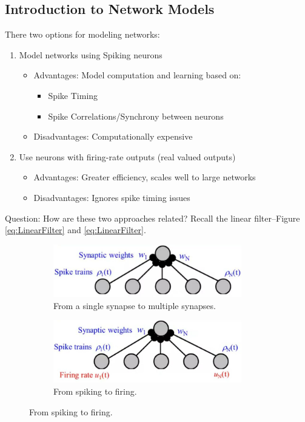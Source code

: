 \documentclass[]{article}
\begin{document}
\subsection{Introduction to Network Models}

There  two options for modeling networks: 
\begin{enumerate}
	\item  Model networks using Spiking neurons
	\begin{itemize}
		\item Advantages: Model computation and learning based on:
		\begin{itemize}
			\item Spike Timing
			\item Spike Correlations/Synchrony between neurons
		\end{itemize}
		\item Disadvantages: Computationally expensive
	\end{itemize}
	\item Use neurons with firing-rate outputs (real valued outputs)
	\begin{itemize}
		\item Advantages: Greater efficiency, scales well to large networks
		\item Disadvantages: Ignores spike timing issues
	\end{itemize}
\end{enumerate}

Question: How are these two approaches related?
Recall the linear filter--Figure \ref{eq:LinearFilter} and \eqref{eq:LinearFilter}.

\begin{figure}[H]
	\begin{center}
		\caption{Constructing a Model}
		\begin{subfigure}[t]{0.45\textwidth}
			\caption{From a single synapse to multiple synapses.}\label{fig:from-single-synapse-to-multiple}
			\includegraphics[width=0.9\textwidth]{from-single-synapse-to-multiple}
		\end{subfigure}
		\begin{subfigure}[t]{0.45\textwidth}
			\caption{From spiking to firing.}\label{fig:from-spiking-to-firing}
			\includegraphics[width=0.9\textwidth]{from-spiking-to-firing}
		\end{subfigure}
	\end{center}
\end{figure}
\end{document}
